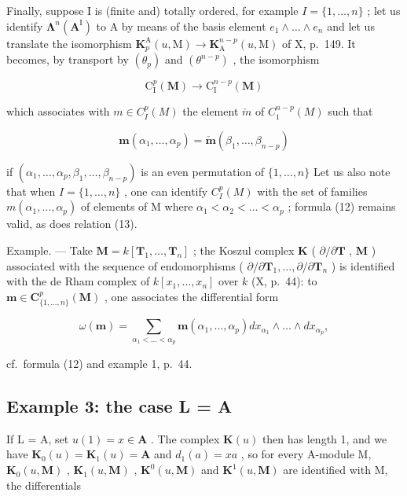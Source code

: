 Finally, suppose I is (finite and) totally ordered, for example \(I = \{1, \ldots, n\}\) ; let us identify \(\symbf{\Lambda}^{n}(\mathbf{A}^{\mathrm{I}})\) to A by means of the basis element \(e_{1} \wedge \ldots \wedge e_{n}\) and let us translate the isomorphism \(\mathbf{K}_{p}^{\mathrm{A}}(u, \mathrm{M}) \to \mathbf{K}_{\mathrm{A}}^{n-p}(u, \mathrm{M})\) of X, p.~149. It becomes, by transport by \((\theta_{p})\) and \((\theta^{n-p})\) , the isomorphism

\[
\mathrm{C} _ {\mathrm{I}} ^ {p} (\mathbf {M}) \rightarrow \mathrm{C} _ {\mathrm{I}} ^ {n - p} (\mathbf {M})
\]

which associates with \(m \in C_{I}^{p}(M)\) the element \(\check{m}\) of \(C_{1}^{n-p}(M)\) such that

\[
\boldsymbol {m} \left(\alpha_ {1}, \dots , \alpha_ {p}\right) = \check {\boldsymbol {m}} \left(\beta_ {1}, \dots , \beta_ {n - p}\right)\tag{13}
\]

if \((\alpha_{1},\ldots,\alpha_{p},\beta_{1},\ldots,\beta_{n-p})\) is an even permutation of \(\{1,\ldots,n\}\) Let us also note that when \(I=\{1,\ldots,n\}\) , one can identify \(C_{I}^{p}(M)\) with the set of families \(m(\alpha_{1},\ldots,\alpha_{p})\) of elements of M where \(\alpha_{1}<\alpha_{2}<\ldots<\alpha_{p}\) ; formula (12) remains valid, as does relation (13).

Example. --- Take \(\mathbf{M} = k[\mathbf{T}_1, \ldots, \mathbf{T}_n]\) ; the Koszul complex \(\mathbf{K}\) ( \(\partial/\partial\mathbf{T}\) , \(\mathbf{M}\) ) associated with the sequence of endomorphisms ( \(\partial/\partial\mathbf{T}_1, \ldots, \partial/\partial\mathbf{T}_n\) ) is identified with the de Rham complex of \(k[x_{1},\ldots,x_{n}]\) over \(k\) (X, p.~44): to \(\boldsymbol{m}\in\mathbf{C}_{\{1,\ldots,n\}}^{p}(\mathbf{M})\) , one associates the differential form

\[
\omega (\boldsymbol {m}) = \sum_ {\alpha_ {1} <   \dots <   \alpha_ {p}} \boldsymbol {m} \left(\alpha_ {1}, \dots , \alpha_ {p}\right) d x _ {\alpha_ {1}} \wedge \dots \wedge d x _ {\alpha_ {p}},
\]

cf.~formula (12) and example 1, p.~44.

\subsection{Example 3: the case L = A}

If L = A, set \(u(1) = x \in \mathbf{A}\) . The complex \(\mathbf{K}(u)\) then has length 1, and we have \(\mathbf{K}_{0}(u) = \mathbf{K}_{1}(u) = \mathbf{A}\) and \(d_{1}(a) = xa\) , so for every A-module M, \(\mathbf{K}_{0}(u, \mathbf{M})\) , \(\mathbf{K}_{1}(u, \mathbf{M})\) , \(\mathbf{K}^{0}(u, \mathbf{M})\) and \(\mathbf{K}^{1}(u, \mathbf{M})\) are identified with M, the differentials

